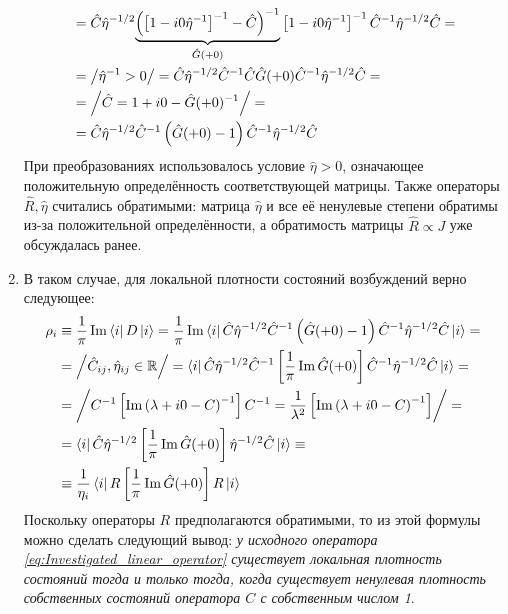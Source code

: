 \begin{enumerate}
\begin{equation}
\begin{split}
			& = \hat{C} \hat{\eta}^{-1/2} \underset{\hat{G}(+0)}{\underbrace{  \left( \left[1 - i 0 \hat{\eta}^{-1} \right]^{-1} - \hat{C} \right)^{-1}  }} \left[1 - i 0 \hat{\eta}^{-1} \right]^{-1} \hat{C}^{-1} \hat{\eta}^{-1/2} \hat{C} = \\
			& = \left/ \hat{\eta}^{-1} > 0 \right/ = \hat{C} \hat{\eta}^{-1/2} \hat{C}^{-1} \hat{C} \hat{G}(+0) \hat{C}^{-1} \hat{\eta}^{-1/2} \hat{C} = \\
			& = \left/ \hat{C} = 1 + i0 - \hat{G}(+0)^{-1} \right/ = \\
			& = \hat{C} \hat{\eta}^{-1/2} \hat{C}^{-1} \left( \hat{G}(+0) - 1 \right) \hat{C}^{-1} \hat{\eta}^{-1/2} \hat{C}
		\end{split}
	\end{equation}
	При преобразованиях использовалось условие $\hat{\eta} > 0$, означающее положительную определённость соответствующей матрицы. Также операторы $\hat{R}, \hat{\eta}$ считались обратимыми: матрица $\hat{\eta}$ и все её ненулевые степени обратимы из-за положительной определённости, а обратимость матрицы $\hat{R} \propto J$ уже обсуждалась ранее.
	
	\item В таком случае, для локальной плотности состояний возбуждений верно следующее:
	\begin{equation}
		\label{eq:Connection_of_LDoS_with_Im_part_of_local_GF}
		\begin{split}
			\rho_i & \equiv \frac{1}{\pi} \Im \left\langle i \right| D \left| i \right\rangle = \frac{1}{\pi}\Im \left\langle i \right| \hat{C} \hat{\eta}^{-1/2} \hat{C}^{-1}  \left( \hat{G}(+0) - 1 \right) \hat{C}^{-1} \hat{\eta}^{-1/2} \hat{C} \left| i \right\rangle = \\
			& = \left/ \hat{C}_{ij}, \hat{\eta}_{ij} \in \mathbb{R} \right/ = \left\langle i \right| \hat{C} \hat{\eta}^{-1/2} \hat{C}^{-1} \left[ \frac{1}{\pi}\Im \hat{G}(+0) \right] \hat{C}^{-1} \hat{\eta}^{-1/2} \hat{C} \left| i \right\rangle = \\
			& =  \left/ C^{-1} \left[ \Im \left(\lambda + i0 - C \right)^{-1} \right] C^{-1} = \frac{1}{\lambda^2} \left[ \Im \left(\lambda + i0 - C \right)^{-1} \right] \right/ = \\
			& = \left\langle i \right| \hat{C} \hat{\eta}^{-1/2} \left[ \frac{1}{\pi}\Im \hat{G}(+0) \right] \hat{\eta}^{-1/2} \hat{C} \left| i \right\rangle \equiv \\
			& \equiv \frac{1}{\eta_i} \left\langle i \right| R \left[ \frac{1}{\pi}\Im \hat{G}(+0) \right] R \left| i \right\rangle
		\end{split}
	\end{equation}
	Поскольку операторы $R$ предполагаются обратимыми, то из этой формулы можно сделать следующий вывод: \textit{у исходного оператора \eqref{eq:Investigated_linear_operator} существует локальная плотность состояний тогда и только тогда, когда существует ненулевая плотность собственных состояний оператора $C$ с собственным числом 1}.
	

\end{enumerate}
